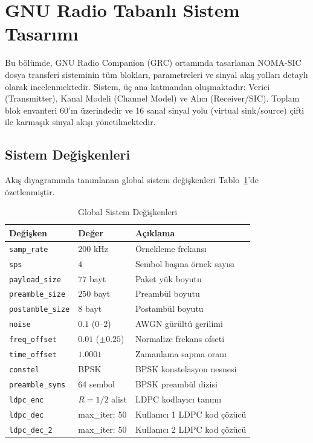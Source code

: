 \section{GNU Radio Tabanlı Sistem Tasarımı}
Bu bölümde, GNU Radio Companion (GRC) ortamında tasarlanan NOMA-SIC dosya transferi sisteminin tüm blokları, parametreleri ve sinyal akış yolları detaylı olarak incelenmektedir. Sistem, üç ana katmandan oluşmaktadır: Verici (Transmitter), Kanal Modeli (Channel Model) ve Alıcı (Receiver/SIC). Toplam blok envanteri 60'ın üzerindedir ve 16 sanal sinyal yolu (virtual sink/source) çifti ile karmaşık sinyal akışı yönetilmektedir.

\subsection{Sistem Değişkenleri}
Akış diyagramında tanımlanan global sistem değişkenleri Tablo~\ref{tab:system_variables}'de özetlenmiştir.

\begin{table}[htbp]
\caption{Global Sistem Değişkenleri}
\label{tab:system_variables}
\centering
\begin{tabular}{lll}
\toprule
\textbf{Değişken} & \textbf{Değer} & \textbf{Açıklama} \\
\midrule
\texttt{samp\_rate} & $200$ kHz & Örnekleme frekansı \\
\texttt{sps} & $4$ & Sembol başına örnek sayısı \\
\texttt{payload\_size} & $77$ bayt & Paket yük boyutu \\
\texttt{preamble\_size} & $250$ bayt & Preambül boyutu \\
\texttt{postamble\_size} & $8$ bayt & Postambül boyutu \\
\texttt{noise} & $0.1$ ($0$--$2$) & AWGN gürültü gerilimi \\
\texttt{freq\_offset} & $0.01$ ($\pm 0.25$) & Normalize frekans ofseti \\
\texttt{time\_offset} & $1.0001$ & Zamanlama sapma oranı \\
\texttt{constel} & BPSK & BPSK konstelasyon nesnesi \\
\texttt{preamble\_syms} & 64 sembol & BPSK preambül dizisi \\
\texttt{ldpc\_enc} & $R=1/2$ alist & LDPC kodlayıcı tanımı \\
\texttt{ldpc\_dec} & max\_iter: 50 & Kullanıcı 1 LDPC kod çözücü \\
\texttt{ldpc\_dec\_2} & max\_iter: 50 & Kullanıcı 2 LDPC kod çözücü \\
\bottomrule
\end{tabular}
\end{table}


